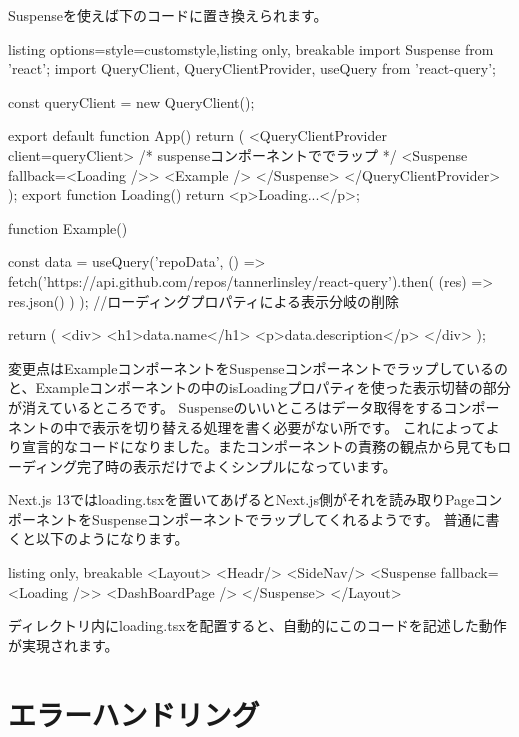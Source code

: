 Suspenseを使えば下のコードに置き換えられます。


\begin{tcblisting}{listing options={style=customstyle},listing only, breakable}
import { Suspense } from 'react';
import { QueryClient, QueryClientProvider, useQuery } from 'react-query';

const queryClient = new QueryClient();

export default function App() {
  return (
    <QueryClientProvider client={queryClient}>
      {/* suspenseコンポーネントででラップ */}
      <Suspense fallback={<Loading />}>
        <Example />
      </Suspense>
    </QueryClientProvider>
  );
}
export function Loading() {
  return <p>Loading...</p>;
}

function Example() {
  const { data } = useQuery('repoData', () =>
    fetch('https://api.github.com/repos/tannerlinsley/react-query').then(
      (res) => res.json()
    )
  );
  //ローディングプロパティによる表示分岐の削除

  return (
    <div>
      <h1>{data.name}</h1>
      <p>{data.description}</p>
    </div>
  );
}

\end{tcblisting}





変更点はExampleコンポーネントをSuspenseコンポーネントでラップしているのと、Exampleコンポーネントの中のisLoadingプロパティを使った表示切替の部分が消えているところです。
Suspenseのいいところはデータ取得をするコンポーネントの中で表示を切り替える処理を書く必要がない所です。
これによってより宣言的なコードになりました。またコンポーネントの責務の観点から見てもローディング完了時の表示だけでよくシンプルになっています。

Next.js 13ではloading.tsxを置いてあげるとNext.js側がそれを読み取りPageコンポーネントをSuspenseコンポーネントでラップしてくれるようです。
普通に書くと以下のようになります。



\begin{tcblisting}{listing only, breakable}
  <Layout>
    <Headr/>
    <SideNav/>
    <Suspense fallback={<Loading />}>
      <DashBoardPage />
    </Suspense>
  </Layout>
\end{tcblisting}

ディレクトリ内にloading.tsxを配置すると、自動的にこのコードを記述した動作が実現されます。



\section{エラーハンドリング}


